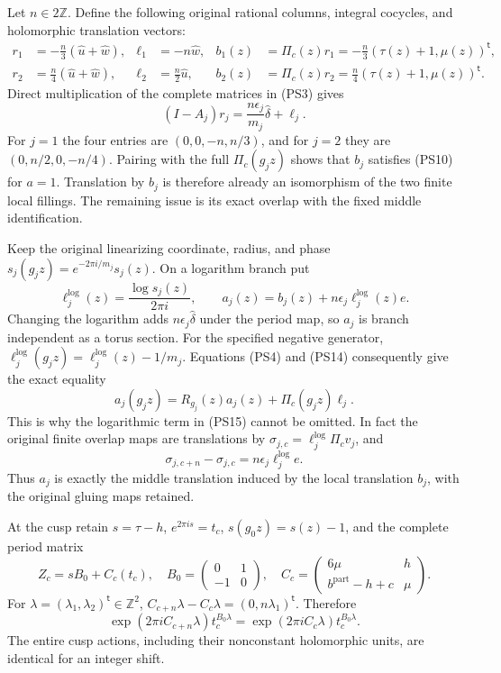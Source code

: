 \documentclass[11pt,a4paper]{article}
\theoremstyle{plain}
\theoremstyle{definition}
\begin{document}
Let $n\in2\mathbb Z$. Define the following original rational columns,
integral cocycles, and holomorphic translation vectors:
\[
\begin{aligned}
 r_1&=-\frac n3(\widehat u+\widehat w),&
 \ell_1&=-n\widehat w,&
 b_1(z)&=\Pi_c(z)r_1=-\frac n3(\tau(z)+1,\mu(z))^{\mathsf t},\\
 r_2&= \frac n4(\widehat u+\widehat w),&
 \ell_2&=\frac n2\widehat u,&
 b_2(z)&=\Pi_c(z)r_2=\frac n4(\tau(z)+1,\mu(z))^{\mathsf t}.
\end{aligned}
\tag{PS13}\label{pshift:eq:local-corrections}
\]
Direct multiplication of the complete matrices in (PS3) gives
\[
 (I-A_j)r_j=\frac{n\epsilon_j}{m_j}\widehat\delta+\ell_j.
 \tag{PS14}\label{pshift:eq:local-matrix-identity}
\]
For $j=1$ the four entries are $(0,0,-n,n/3)$, and for $j=2$
they are $(0,n/2,0,-n/4)$. Pairing with the full $\Pi_c(g_jz)$
shows that $b_j$ satisfies (PS10) for $a=1$.
Translation by $b_j$ is therefore already an isomorphism of the
two finite local fillings. The remaining issue is its exact overlap
with the fixed middle identification.

Keep the original linearizing coordinate, radius, and phase
$s_j(g_jz)=e^{-2\pi i/m_j}s_j(z)$. On a logarithm branch put
\[
 \ell^{\log}_j(z)=\frac{\log s_j(z)}{2\pi i},\qquad
 a_j(z)=b_j(z)+n\epsilon_j \ell^{\log}_j(z)e.
 \tag{PS15}\label{pshift:eq:finite-middle-sections}
\]
Changing the logarithm adds $n\epsilon_j\widehat\delta$ under the
period map, so $a_j$ is branch independent as a torus section.
For the specified negative generator, $\ell^{\log}_j(g_jz)=\ell^{\log}_j(z)-1/m_j$.
Equations (PS4) and (PS14) consequently give the exact equality
\[
 a_j(g_jz)=R_{g_j}(z)a_j(z)+\Pi_c(g_jz)\ell_j.
 \tag{PS16}\label{pshift:eq:local-affine-cocycle}
\]
This is why the logarithmic term in (PS15) cannot be omitted.
In fact the original finite overlap maps are translations by
$\sigma_{j,c}=\ell^{\log}_j\Pi_c v_j$, and
\[
                  \sigma_{j,c+n}-\sigma_{j,c}
                     =n\epsilon_j\ell^{\log}_je.
 \tag{PS17}\label{pshift:eq:actual-overlap-difference}
\]
Thus $a_j$ is exactly the middle translation induced by the local
translation $b_j$, with the original gluing maps retained.

At the cusp retain $s=\tau-h$, $e^{2\pi is}=t_c$, $s(g_0z)=s(z)-1$,
and the complete period matrix
\[
 Z_c=sB_0+C_c(t_c),\quad
 B_0=\begin{pmatrix}0&1\\-1&0\end{pmatrix},\quad
 C_c=\begin{pmatrix}6\mu&h\\ b^{\mathrm{part}}-h+c&\mu\end{pmatrix}.
 \tag{PS18}\label{pshift:eq:cusp-periods}
\]
For $\lambda=(\lambda_1,\lambda_2)^{\mathsf t}\in\mathbb Z^2$,
$C_{c+n}\lambda-C_c\lambda=(0,n\lambda_1)^{\mathsf t}$. Therefore
\[
 \exp(2\pi iC_{c+n}\lambda)t_c^{B_0\lambda}
       =\exp(2\pi iC_c\lambda)t_c^{B_0\lambda}.
 \tag{PS19}\label{pshift:eq:cusp-actions-identical}
\]
The entire cusp actions, including their nonconstant holomorphic units,
are identical for an integer shift.
\end{document}
